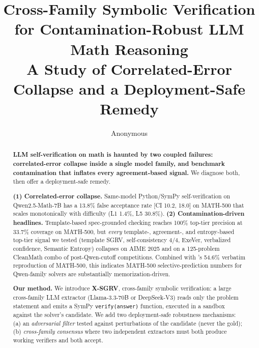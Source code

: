 \documentclass{article}
\title{\Large\textbf{Cross-Family Symbolic Verification for Contamination-Robust LLM Math Reasoning}\\[4pt]
\large A Study of Correlated-Error Collapse and a Deployment-Safe Remedy}
\author{Anonymous}
\date{}
\begin{document}
\maketitle

\begin{abstract}
\textbf{LLM self-verification on math is haunted by two coupled failures: correlated-error collapse inside a single model family, and benchmark contamination that inflates every agreement-based signal.} We diagnose both, then offer a deployment-safe remedy.

\textbf{(1) Correlated-error collapse.} Same-model Python/SymPy self-verification on Qwen2.5-Math-7B has a 13.8\% false acceptance rate [CI 10.2, 18.0] on MATH-500 that scales monotonically with difficulty (L1 1.4\%, L5 30.8\%). \textbf{(2) Contamination-driven headlines.} Template-based spec-grounded checking reaches 100\% top-tier precision at 33.7\% coverage on MATH-500, but \emph{every} template-, agreement-, and entropy-based top-tier signal we tested (template SGRV, self-consistency 4/4, ExeVer, verbalized confidence, Semantic Entropy) collapses on AIME 2025 and on a 125-problem CleanMath combo of post-Qwen-cutoff competitions. Combined with \citet{wu2025contam}'s 54.6\% verbatim reproduction of MATH-500, this indicates MATH-500 selective-prediction numbers for Qwen-family solvers are substantially memorization-driven.

\textbf{Our method.} We introduce \textbf{X-SGRV}, cross-family symbolic verification: a large cross-family LLM extractor (Llama-3.3-70B or DeepSeek-V3) reads only the problem statement and emits a SymPy \texttt{verify(answer)} function, executed in a sandbox against the solver's candidate. We add two deployment-safe robustness mechanisms: (a) an \emph{adversarial filter} tested against perturbations of the candidate (never the gold); (b) \emph{cross-family consensus} where two independent extractors must both produce working verifiers and both accept.


\end{abstract}
\end{document}
